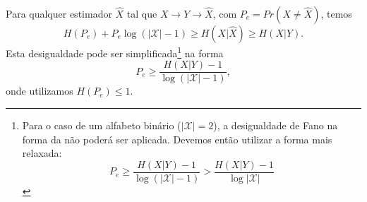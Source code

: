 \begin{theorem}\label{thm:desfano}
  Para qualquer estimador $\hat{X}$ tal que $X \rightarrow Y \rightarrow \hat{X}$, com
  $P_e = Pr(X \neq \hat{X})$, temos
  \begin{equation}\label{eq:desfano}
    H(P_e) + P_e \log \left( \vert \mathcal{X} \vert - 1 \right) \geq H(X|\hat{X}) \geq H(X|Y) .
  \end{equation}
  Esta desigualdade pode ser simplificada\footnote{
    Para o caso de um alfabeto binário ($\vert \mathcal{X} \vert = 2$),
    a desigualdade de Fano na forma da 
    não poderá ser aplicada. Devemos então utilizar a forma mais relaxada:
    \begin{equation}
      P_e \geq \frac{H(X|Y) - 1}{\log \left( \vert \mathcal{X} \vert - 1 \right)}
         > \frac{H(X|Y) - 1}{\log \vert \mathcal{X} \vert }
    \end{equation}
  } na forma
  \begin{equation}\label{eq:desfanorelax}
  P_e \geq \frac{H(X|Y) - 1}{\log \left( \vert \mathcal{X} \vert - 1 \right)} ,
  \end{equation}
  onde utilizamos $H(P_e) \leq 1$.
\end{theorem}
